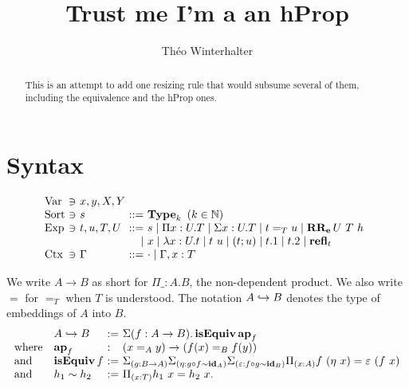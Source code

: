 \documentclass[a4paper,english]{lipics-utf8x}
\title{Trust me I'm a an hProp}
\author[1]{Théo Winterhalter}
\begin{document}
  \maketitle

  \begin{abstract}
    This is an attempt to add one resizing rule that would subsume several of
    them, including the equivalence and the hProp ones.
  \end{abstract}

  \section{Syntax}

  \[
    \begin{array}{l@{~}l@{~}l@{~}r@{~}l@{\quad}l}
      \Var  & \ni & x,y,X,Y \\
      \Sort & \ni & s             & ::= & \Type_k \mbox{ }
                                                (k \in \mathbb{N}) \\
      \Exp  & \ni & t,u,T,U & ::= & s \mid \Pi x:U.T \mid \Sigma x:U.T \mid
                                    t =_T u \mid \RRe{U}{T}{h} \\
                         &&& \mid & x \mid \lambda x:U.t \mid t~u
                               \mid (t;u) \mid t.1 \mid t.2 \mid \refl_t \\
      \Ctx  & \ni & \Gamma  & ::= & \cdot \mid \Gamma, x:T \\
    \end{array}
  \]

  \noindent %
  We write $A \to B$ as short for $\Pi \_:A.B$, the non-dependent product.
  We also write $=$ for $=_T$ when $T$ is understood.
  The notation $A \hookrightarrow B$ denotes the type of embeddings of $A$ into $B$.
  \[
    \begin{array}{l@{\quad}l@{~}l@{~}l}
      & \emb{A}{B} &:=& \Sigma (f : A \to B). \isEquiv \ap_f \\
      \text{where} & \ap_f &:& (x =_A y) \to (f(x) =_B f(y)) \\
      \text{and} & \isEquiv f &:=& \Sigma_{(g : B \to A)}
                               \Sigma_{(\eta : g \circ f \sim \id_A)}
                               \Sigma_{(\varepsilon : f \circ g \sim \id_B)}
                               \Pi_{(x : A)} f~(\eta~x) = \varepsilon~(f~x) \\
      \text{and} & h_1 \sim h_2 &:=& \Pi_{(x : T)} h_1~x = h_2~x.
    \end{array}
  \]
\end{document}
